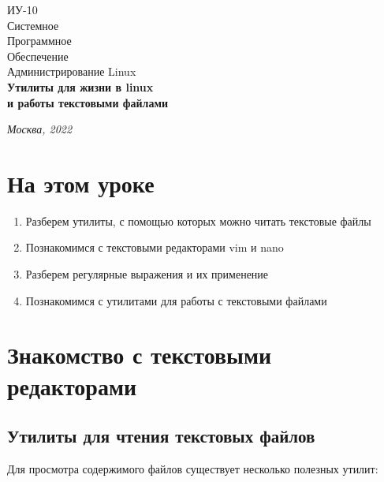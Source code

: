 \documentclass[14pt, a4paper]{article}
\begin{document}
\begin{titlepage}
    \topmargin=216pt
    \newpage
    \hangindent=0.7cm
    \huge ИУ-10\\
    Системное\\
    Программное\\
    Обеспечение\\
    Администрирование Linux\\
    \textbf{Утилиты для жизни в linux \\
    и работы текстовыми файлами}

    \vspace{9cm}

    \begin{center}
        \small\textit{Москва, 2022}
    \end{center}
\end{titlepage}

\section*{На этом уроке}
\begin{enumerate}
    \item Разберем утилиты, с помощью которых можно читать текстовые файлы
    \item Познакомимся с текстовыми редакторами vim и nano
    \item Разберем регулярные выражения и их применение
    \item Познакомимся с утилитами для работы с текстовыми файлами
\end{enumerate}


\tableofcontents
\newpage

\section*{Знакомство с текстовыми редакторами} 

\subsection*{Утилиты для чтения текстовых файлов} 

Для просмотра содержимого файлов существует несколько полезных утилит:
\end{document}
